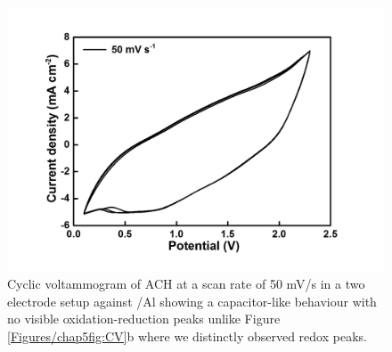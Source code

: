 \begin{figure}[tbh!]
  \centering
  \includegraphics[width=\textwidth]{Figures/chap5fig/hair50mVs}
    \caption{Cyclic voltammogram of ACH at a scan rate of 50 mV/s in a two electrode setup against /Al showing a capacitor-like behaviour with no visible oxidation-reduction peaks unlike Figure \ref{Figures/chap5fig:CV}b where we distinctly observed redox peaks.}
  \label{Figures/chap5fig:hair50mVs}
\end{figure}


